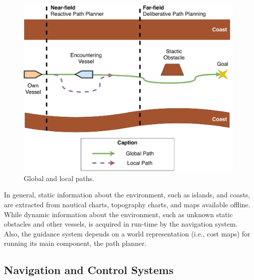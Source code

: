     \begin{figure}[H]
        \centering
        \includegraphics[scale=0.6]{figs/Chap2/GlobalLocalPath.pdf}
        \caption{Global and local paths.}
        \label{fig:chap2_globallocalpath}
    \end{figure}

    In general, static information about the environment, such as islands, and coasts, are extracted from nautical charts, topography charts, and maps available offline. While dynamic information about the environment, such as unknown static obstacles and other vessels, is acquired in run-time by the navigation system. Also, the guidance system depends on a world representation (i.e., cost maps) for running its main component, the path planner.

    \subsection{Navigation and Control Systems}
    
     
    
